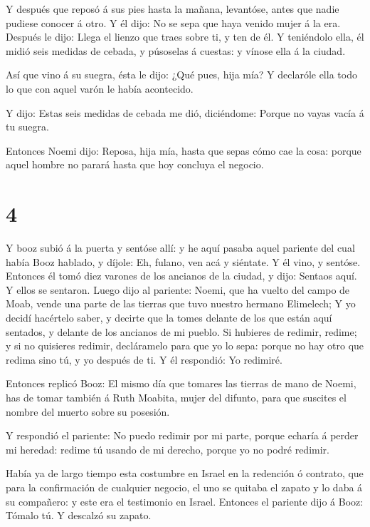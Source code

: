  Y después que reposó á sus pies hasta la mañana,
levantóse, antes que nadie pudiese conocer á otro. Y él dijo: No se sepa
que haya venido mujer á la era.  Después le dijo: Llega el
lienzo que traes sobre ti, y ten de él. Y teniéndolo ella, él midió seis
medidas de cebada, y púsoselas á cuestas: y vínose ella á la ciudad.

 Así que vino á su suegra, ésta le dijo: ¿Qué pues, hija
mía? Y declaróle ella todo lo que con aquel varón le había acontecido.

 Y dijo: Estas seis medidas de cebada me dió, diciéndome:
Porque no vayas vacía á tu suegra.

 Entonces Noemi dijo: Reposa, hija mía, hasta que sepas
cómo cae la cosa: porque aquel hombre no parará hasta que hoy concluya
el negocio.

\hypertarget{section-3}{%
\section{4}\label{section-3}}

 Y booz subió á la puerta y sentóse allí: y he aquí pasaba
aquel pariente del cual había Booz hablado, y díjole: Eh, fulano, ven
acá y siéntate. Y él vino, y sentóse.  Entonces él tomó diez
varones de los ancianos de la ciudad, y dijo: Sentaos aquí. Y ellos se
sentaron.  Luego dijo al pariente: Noemi, que ha vuelto del
campo de Moab, vende una parte de las tierras que tuvo nuestro hermano
Elimelech;  Y yo decidí hacértelo saber, y decirte que la
tomes delante de los que están aquí sentados, y delante de los ancianos
de mi pueblo. Si hubieres de redimir, redime; y si no quisieres redimir,
decláramelo para que yo lo sepa: porque no hay otro que redima sino tú,
y yo después de ti. Y él respondió: Yo redimiré.

 Entonces replicó Booz: El mismo día que tomares las tierras
de mano de Noemi, has de tomar también á Ruth Moabita, mujer del
difunto, para que suscites el nombre del muerto sobre su posesión.

 Y respondió el pariente: No puedo redimir por mi parte,
porque echaría á perder mi heredad: redime tú usando de mi derecho,
porque yo no podré redimir.

 Había ya de largo tiempo esta costumbre en Israel en la
redención ó contrato, que para la confirmación de cualquier negocio, el
uno se quitaba el zapato y lo daba á su compañero: y este era el
testimonio en Israel.  Entonces el pariente dijo á Booz:
Tómalo tú. Y descalzó su zapato.

